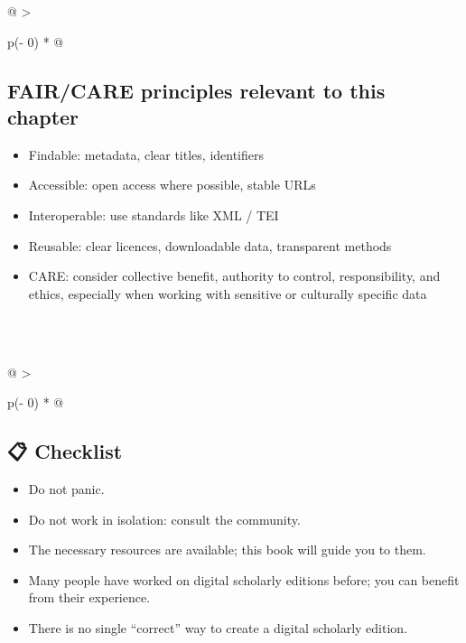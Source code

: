 \documentclass[
  letterpaper,
  DIV=11,
  numbers=noendperiod]{scrreprt}
\begin{document}
\begin{longtable}[]{@{}
  >{\raggedright\arraybackslash}p{(\columnwidth - 0\tabcolsep) * }@{}}
\toprule\noalign{}
\begin{minipage}[b]{\linewidth}\raggedright
\subsection*{\texorpdfstring{\textbf{FAIR/CARE principles relevant to
this
chapter}}{FAIR/CARE principles relevant to this chapter}}\label{faircare-principles-relevant-to-this-chapter}

\begin{itemize}
\item
  Findable: metadata, clear titles, identifiers
\item
  Accessible: open access where possible, stable URLs
\item
  Interoperable: use standards like XML / TEI
\item
  Reusable: clear licences, downloadable data, transparent methods
\item
  CARE: consider collective benefit, authority to control,
  responsibility, and ethics, especially when working with sensitive or
  culturally specific data
\end{itemize}
\end{minipage} \\
\midrule\noalign{}
\endhead
\bottomrule\noalign{}
\endlastfoot
 \\
\end{longtable}

\begin{longtable}[]{@{}
  >{\raggedright\arraybackslash}p{(\columnwidth - 0\tabcolsep) * }@{}}
\toprule\noalign{}
\begin{minipage}[b]{\linewidth}\raggedright
\subsection*{\texorpdfstring{\textbf{📋
Checklist}}{📋 Checklist}}\label{checklist-ch01}

\begin{itemize}
\item
  Do not panic.
\item
  Do not work in isolation: consult the community.
\item
  The necessary resources are available; this book will guide you to
  them.
\item
  Many people have worked on digital scholarly editions before; you can
  benefit from their experience.
\item
  There is no single ``correct'' way to create a digital scholarly
  edition.
\end{itemize}
\end{minipage} \\
\midrule\noalign{}
\endhead
\bottomrule\noalign{}
\endlastfoot
 \\
\end{longtable}
\end{document}
